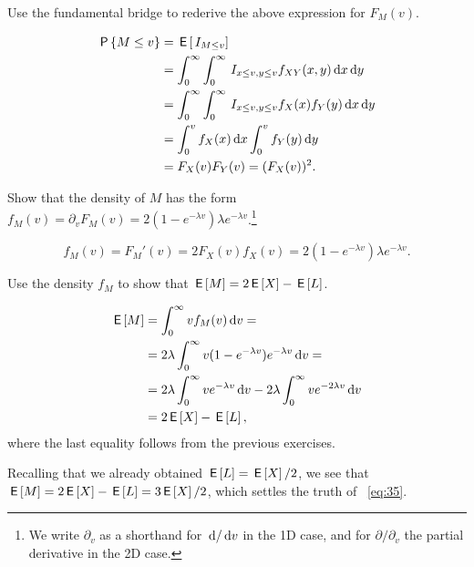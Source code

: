 \begin{exercise}
Use the fundamental bridge to rederive the above expression for $F_M(v)$.
\begin{solution}
\begin{align*}
\,\mathsf{P}\left\{M\leq v\right\}
&= \,\mathsf{E}\left[\,I_{M\leq v}\right] \\
&=\int_0^{\infty} \int_0^{\infty} \,I_{x\leq v, y\leq v} f_{XY}(x,y) \,\textrm{d}x \,\textrm{d}y \\
&= \int_0^{\infty} \int_0^{\infty} \,I_{x\leq v, y\leq v} f_{X}(x) f_{Y}(y) \,\textrm{d}x \,\textrm{d}y \\
&= \int_0^{v} f_{X}(x) \,\textrm{d}x \int_0^{v}  f_{Y}(y)  \,\textrm{d}y \\
&= F_{X}(v) F_Y(v) = (F_X(v))^2.
\end{align*}
\end{solution}
\end{exercise}


\begin{exercise}\label{ex:6}
Show that the density of $M$ has the form $f_{M}(v)=\partial_{v} F_M(v) = 2(1-e^{-\lambda v}) \lambda e^{-\lambda v}$.\footnote{We write $\partial_{v}$ as a shorthand for $\,\textrm{d}/\,\textrm{d}v$ in the 1D case, and for $\partial/\partial_{v}$ the partial derivative in the 2D case.}
\begin{solution}
\begin{equation*}
  f_M(v) = F_M'(v) = 2 F_X(v) f_X(v) = 2(1-e^{-\lambda v}) \lambda e^{- \lambda v}.
\end{equation*}
\end{solution}
\end{exercise}

\begin{exercise}
Use  the density $f_{M}$ to show  that $\,\mathsf{E}\left[M\right] = 2\,\mathsf{E}\left[X\right] - \,\mathsf{E}\left[L\right]$.
\begin{solution}
\begin{align*}
\,\mathsf{E}\left[M\right]
&= \int_{0}^{\infty} v f_M(v) \,\textrm{d}v = \\
&= 2 \lambda \int_{0}^{\infty} v (1-e^{-\lambda v}) e^{-\lambda v} \,\textrm{d}v = \\
&= 2 \lambda \int_{0}^{\infty} v e^{-\lambda v} \,\textrm{d}v -  2 \lambda \int_{0}^{\infty} v e^{-2 \lambda v} \,\textrm{d}v \\
&= 2 \,\mathsf{E}\left[X\right] - \,\mathsf{E}\left[L\right],
\end{align*}
where the last equality follows from the previous exercises.
\end{solution}
\end{exercise}

Recalling that we already obtained  $\,\mathsf{E}\left[L\right] = \,\mathsf{E}\left[X\right]/ 2$,  we see that $\,\mathsf{E}\left[M\right] = 2 \,\mathsf{E}\left[X\right] - \,\mathsf{E}\left[L\right] = 3\,\mathsf{E}\left[X\right]/2$, which settles the truth of ~\cref{eq:35}.



